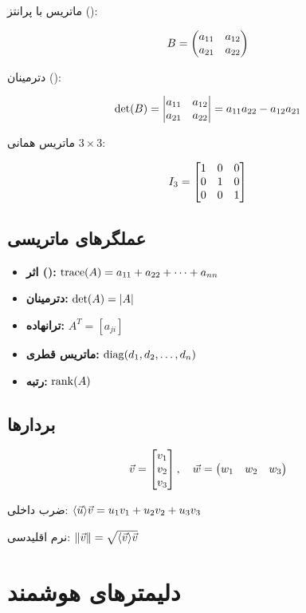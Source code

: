 \documentclass{matinbook}
\begin{document}
ماتریس با پرانتز ():

\[
B = \begin{pmatrix}a_{11} & a_{12} \\ a_{21} & a_{22}\end{pmatrix}
\]

دترمینان ():

\[
\det(B) = \begin{vmatrix}a_{11} & a_{12} \\ a_{21} & a_{22}\end{vmatrix}
= a_{11}a_{22} - a_{12}a_{21}
\]

ماتریس همانی $3 \times 3$:

\[
I_{3} = \begin{bmatrix}1 & 0 & 0 \\ 0 & 1 & 0 \\ 0 & 0 & 1\end{bmatrix}
\]

\section{عملگرهای ماتریسی}
\label{sec:matrices-operators}

\begin{itemize}
    \item \textbf{اثر ():}
    $\operatorname{trace}(A) = a_{11} + a_{22} + \cdots + a_{nn}$
    \item \textbf{دترمینان:} $\det(A) = \lvert A\rvert$
    \item \textbf{ترانهاده:} $A^{T} = [a_{ji}]$
    \item \textbf{ماتریس قطری:}
    $\operatorname{diag}(d_{1}, d_{2}, \ldots, d_{n})$
    \item \textbf{رتبه:} $\operatorname{rank}(A)$
\end{itemize}

\section{بردارها}
\label{sec:matrices-vectors}

\[
\vec{v} = \begin{bmatrix}v_{1} \\ v_{2} \\ v_{3}\end{bmatrix}, \quad
\vec{w} = \begin{pmatrix}w_{1} & w_{2} & w_{3}\end{pmatrix}
\]

ضرب داخلی: $\langle\vec{u}\rangle{\vec{v}} = u_{1}v_{1} + u_{2}v_{2} + u_{3}v_{3}$

نرم اقلیدسی: $\lVert\vec{v}\rVert = \sqrt{\langle\vec{v}\rangle{\vec{v}}}$

\chapter{دلیمترهای هوشمند}
\label{chap:delimiters}
\end{document}
